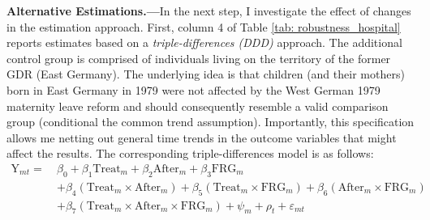\documentclass[11pt, a4paper]{article} %
\begin{document}
\textbf{Alternative Estimations.---}In the next step, I investigate the effect of changes in the estimation approach. First, column 4 of Table \ref{tab: robustness_hospital} reports estimates based on a \textit{triple-differences (DDD)} approach. The additional control group is comprised of individuals living on the territory of the former GDR (East Germany). The underlying idea is that children (and their mothers) born in East Germany in 1979 were not affected by the West German 1979 maternity leave reform and should consequently resemble a valid comparison group (conditional the common trend assumption). Importantly, this specification allows me netting out general time trends in the outcome variables that might affect the results. The corresponding triple-differences model is as follows:
\begin{align}
\text{Y}_{mt} =\ &\beta_0 + \beta_1 \text{Treat}_{m} + \beta_2 \text{After}_{m} + \beta_3 \text{FRG}_m \nonumber\\&+ \beta_4 (\text{Treat}_{m} \times \text{After}_{m}) + \beta_5 (\text{Treat}_m \times \text{FRG}_m) + \beta_6 (\text{After}_m \times \text{FRG}_m) \nonumber\\ &+ \beta_7 (\text{Treat}_m\times \text{After}_m\times \text{FRG}_m) + \psi_m + \rho_t + \varepsilon_{mt} \label{eq:DDD}
\end{align}
\end{document}
